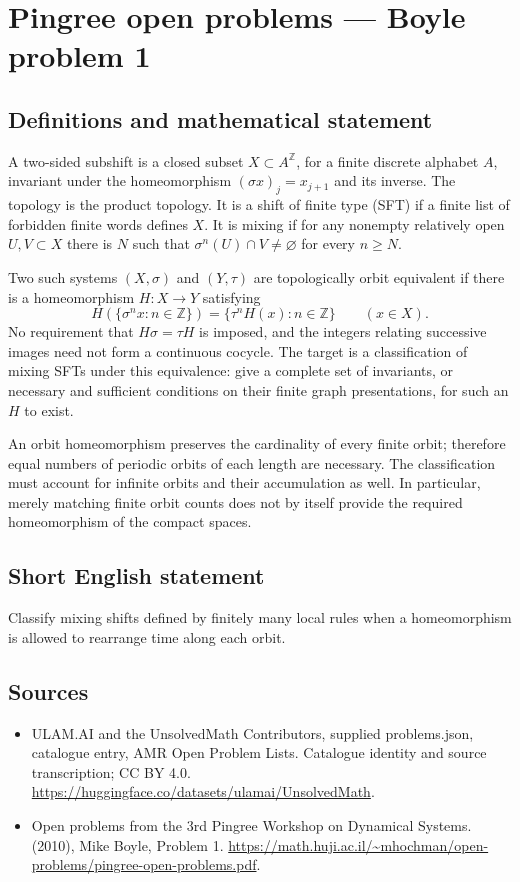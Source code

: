 \documentclass[11pt,a4paper]{article}
\begin{document}
\section*{Pingree open problems — Boyle problem 1}\label{statement}

\subsection{Definitions and mathematical statement}
A two-sided subshift is a closed subset $X\subset A^{\mathbb Z}$, for a
finite discrete alphabet $A$, invariant under the homeomorphism
$(\sigma x)_j=x_{j+1}$ and its inverse. The topology is the product topology.
It is a shift of finite type (SFT) if a finite list of forbidden finite words
defines $X$. It is mixing if for any nonempty relatively open $U,V\subset X$
there is $N$ such that $\sigma^n(U)\cap V\ne\varnothing$ for every $n\ge N$.

Two such systems $(X,\sigma)$ and $(Y,\tau)$ are topologically orbit equivalent
if there is a homeomorphism $H:X\to Y$ satisfying
\[
 H(\{\sigma^n x:n\in\mathbb Z\})
   =\{\tau^n H(x):n\in\mathbb Z\}\qquad(x\in X).
\]
No requirement that $H\sigma=\tau H$ is imposed, and the integers relating
successive images need not form a continuous cocycle. The target is a
classification of mixing SFTs under this equivalence: give a complete set of
invariants, or necessary and sufficient conditions on their finite graph
presentations, for such an $H$ to exist.

An orbit homeomorphism preserves the cardinality of every finite orbit;
therefore equal numbers of periodic orbits of each length are necessary.
The classification must account for infinite orbits and their accumulation
as well. In particular, merely matching finite orbit counts does not by
itself provide the required homeomorphism of the compact spaces.
\subsection{Short English statement}
Classify mixing shifts defined by finitely many local rules when a homeomorphism is allowed to rearrange time along each orbit.
\subsection{Sources}
\begin{itemize}
\item[S1] ULAM.AI and the UnsolvedMath Contributors, supplied problems.json, catalogue entry, AMR Open Problem Lists. Catalogue identity and source transcription; CC BY 4.0.
\url{https://huggingface.co/datasets/ulamai/UnsolvedMath}.
\item[S2] Open problems from the 3rd Pingree Workshop on Dynamical Systems. (2010), Mike Boyle, Problem 1. 
\url{https://math.huji.ac.il/~mhochman/open-problems/pingree-open-problems.pdf}.
\end{itemize}
\end{document}
